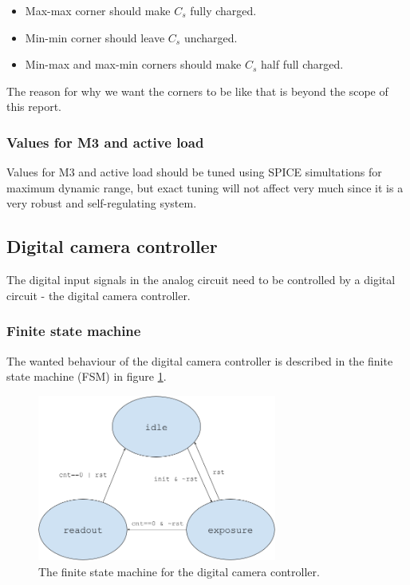 \begin{itemize}
    \item Max-max corner should make $C_s$ fully charged.
    \item Min-min corner should leave $C_s$ uncharged.
    \item Min-max and max-min corners should make $C_s$ half full charged.
\end{itemize}

The reason for why we want the corners to be like that is beyond the scope of this report.

\subsubsection{Values for M3 and active load}


Values for M3 and active load should be tuned using SPICE simultations for maximum dynamic range, but exact tuning will not affect very much since it is a very robust and self-regulating system.

\subsection{Digital camera controller}
The digital input signals in the analog circuit need to be controlled by a digital circuit - the digital camera controller.

\subsubsection{Finite state machine}
The wanted behaviour of the digital camera controller is described in the finite state machine (FSM) in figure \ref{fig:fsm}.

\begin{figure}[H]
    \centering
    \includegraphics[width=0.7\textwidth]{graphs/fsm.png}
    \caption{The finite state machine for the digital camera controller.}
    \label{fig:fsm}
\end{figure}

